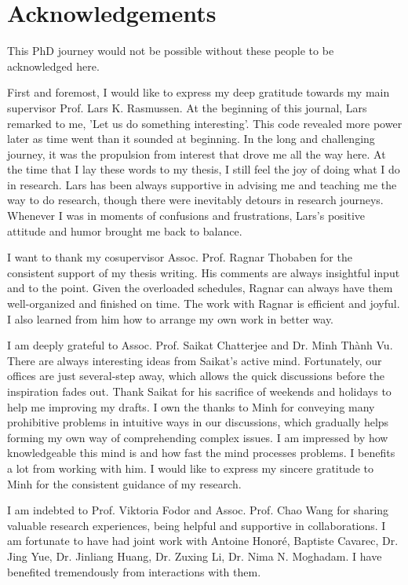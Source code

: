 \chapter{Acknowledgements}
This PhD journey would not be possible without these people to be acknowledged here.

First and foremost, I would like to express my deep gratitude towards my main supervisor Prof. Lars K. Rasmussen. At the beginning of this journal, Lars remarked to me, 'Let us do something interesting'. This code revealed more power later as time went than it sounded at beginning. In the long and challenging journey, it was the propulsion from interest that drove me all the way here. At the time that I lay these words to my thesis, I still feel the joy of doing what I do in research. Lars has been always supportive in advising me and teaching me the way to do research, though there were inevitably detours in research journeys. Whenever I was in moments of confusions and frustrations, Lars's positive attitude and humor brought me back to balance.

I want to thank my cosupervisor Assoc. Prof. Ragnar Thobaben for the consistent support of my thesis writing. His comments are always insightful input and to the point. Given the overloaded schedules, Ragnar can always have them well-organized and finished on time. The work with Ragnar is efficient and joyful. I also learned from him how to arrange my own work in better way. 

I am deeply grateful to Assoc. Prof. Saikat Chatterjee and Dr. Minh Th\`{a}nh Vu. There are always interesting ideas from Saikat's active mind. Fortunately, our offices are just several-step away, which allows the quick discussions before the inspiration fades out. Thank Saikat for his sacrifice of weekends and holidays to help me improving my drafts.
I own the thanks to Minh for conveying many prohibitive problems in intuitive ways in our discussions, which gradually helps forming my own way of comprehending complex issues. I am impressed by how knowledgeable this mind is and how fast the mind processes problems. I benefits a lot from working with him. I would like to express my sincere gratitude to Minh for the consistent guidance of my research.

I am indebted to Prof. Viktoria Fodor and Assoc. Prof. Chao Wang for sharing valuable research experiences, being helpful and supportive in collaborations. I am fortunate to have had joint work with Antoine Honor{\'e}, Baptiste Cavarec, Dr. Jing Yue, Dr. Jinliang Huang, Dr. Zuxing Li, Dr. Nima N. Moghadam. I have benefited tremendously from interactions with them.


